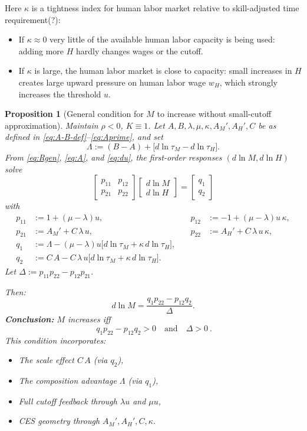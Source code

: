 \documentclass[english]{article}
\newtheorem{proposition}{Proposition}
\begin{document}
Here $\kappa$ is a tightness index for human labor market relative to skill-adjusted time requirement(?):
\begin{itemize}
    \item If $\kappa \approx 0$ very little of the available human labor capacity is being used: adding more $H$ hardly changes wages or the cutoff.
    \item If $\kappa$ is large, the human labor market is close to capacity: small increases in $H$ creates large upward pressure on human labor wage $w_H$, which strongly increases the threshold $u$.
\end{itemize}




\newpage




\begin{proposition}[General condition for $M$ to increase without small-cutoff approximation]\label{prop:M_increase_general}
Maintain $\rho<0$, $K\equiv 1$.  
Let $A,B,\lambda,\mu,\kappa,A_M',A_H',C$ be as defined in \eqref{eq:A-B-def}–\eqref{eq:Aprime}, and set
\[
\Lambda := (B-A) + \big[d\ln\tau_M - d\ln\tau_H\big].
\]
From \eqref{eq:Rgen}, \eqref{eq:A}, and \eqref{eq:du}, the first-order responses $(d\ln M,d\ln H)$ solve
\[
\begin{bmatrix}
p_{11} & p_{12} \\
p_{21} & p_{22}
\end{bmatrix}
\begin{bmatrix}
d\ln M \\[2pt]
d\ln H
\end{bmatrix}
=
\begin{bmatrix}
q_{1} \\[2pt]
q_{2}
\end{bmatrix}
\]
with
\begin{align*}
p_{11} &:= 1+(\mu-\lambda)u, 
&\quad p_{12} &:= -1+(\mu-\lambda)u\,\kappa, \\
p_{21} &:= A_M' + C\,\lambda\,u, 
&\quad p_{22} &:= A_H' + C\,\lambda\,u\,\kappa, \\
q_{1}  &:= \Lambda - (\mu-\lambda)u\big[d\ln\tau_M+\kappa\,d\ln\tau_H\big], \\
q_{2}  &:= C\,A - C\,\lambda\,u\big[d\ln \tau_M + \kappa\,d\ln \tau_H\big].
\end{align*}
Let $\Delta := p_{11}p_{22} - p_{12}p_{21}$.

Then:
\[
d\ln M = \frac{q_{1} p_{22} - p_{12} q_{2}}{\Delta}.
\]
\smallskip
\noindent
\textbf{Conclusion:} $M$ increases iff
\[
\boxed{\ q_{1} p_{22} - p_{12} q_{2} > 0 \quad\text{and}\quad \Delta>0\ }.
\]
This condition incorporates:
\begin{itemize}
\item The \emph{scale effect} $C\,A$ (via $q_{2}$),
\item The \emph{composition advantage} $\Lambda$ (via $q_{1}$),
\item Full cutoff feedback through $\lambda u$ and $\mu u$,
\item CES geometry through $A_M',A_H',C,\kappa$.
\end{itemize}
\end{proposition}
\end{document}
